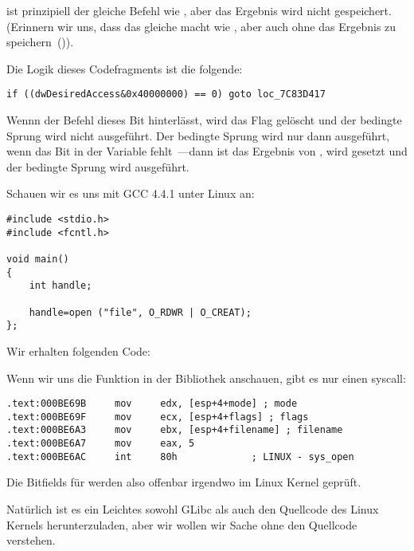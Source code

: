 \TEST ist prinzipiell der gleiche Befehl wie \AND, aber das Ergebnis wird nicht
gespeichert. (Erinnern wir uns, dass \CMP das gleiche macht wie \SUB, aber auch
ohne das Ergebnis zu speichern~()).

Die Logik dieses Codefragments ist die folgende:

\begin{lstlisting}[style=customc]
if ((dwDesiredAccess&0x40000000) == 0) goto loc_7C83D417
\end{lstlisting}

Wennn der \AND Befehl dieses Bit hinterlässt, wird das \ZF Flag gelöscht und der
bedingte Sprung \JZ wird nicht ausgeführt.
Der bedingte Sprung wird nur dann ausgeführt, wenn das Bit  in
der Variable  fehlt~---dann ist das Ergebnis von , \ZF
wird gesetzt und der bedingte Sprung wird ausgeführt.

Schauen wir es uns mit GCC 4.4.1 unter Linux an:

\begin{lstlisting}[style=customc]
#include <stdio.h>
#include <fcntl.h>

void main()
{
	int handle;

	handle=open ("file", O_RDWR | O_CREAT);
};
\end{lstlisting}

Wir erhalten folgenden Code:



Wenn wir uns die Funktion  in der Bibliothek 
anschauen, gibt es nur einen syscall:

\begin{lstlisting}[caption=open() (libc.so.6),style=customasmx86]
.text:000BE69B     mov     edx, [esp+4+mode] ; mode
.text:000BE69F     mov     ecx, [esp+4+flags] ; flags
.text:000BE6A3     mov     ebx, [esp+4+filename] ; filename
.text:000BE6A7     mov     eax, 5
.text:000BE6AC     int     80h             ; LINUX - sys_open
\end{lstlisting}

Die Bitfields für  werden also offenbar irgendwo im Linux Kernel
geprüft.

Natürlich ist es ein Leichtes sowohl GLibc als auch den Quellcode des Linux
Kernels herunterzuladen, aber wir wollen wir Sache ohne den Quellcode verstehen.


